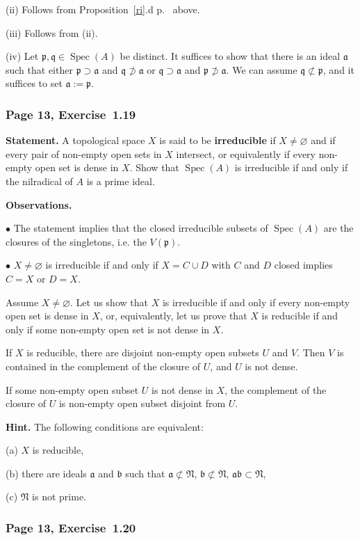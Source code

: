 \documentclass[12pt,letterpaper]{article}%
\newcommand{\mf}{\mathfrak}
\newcommand{\aaa}{\mf a}
\newcommand{\bbb}{\mf b}
\newcommand{\ppp}{\mf p}
\newcommand{\qqq}{\mf q}
\newcommand{\NNN}{\mf N}\newcommand{\RRR}{\mf R}
\newcommand{\bu}{\bullet}
\newcommand{\Spec}{\operatorname{Spec}}\newcommand{\Sp}{\operatorname{Spec}}
\newcommand{\nn}{\noindent}
\begin{document}
\nn(ii) Follows from Proposition~\ref{ri}.d p.~\pageref{ri} above. 

\nn(iii) Follows from (ii).

\nn(iv) Let $\ppp,\qqq\in\Spec(A)$ be distinct. It suffices to show that there is an ideal $\aaa$ such that either $\ppp\supset\aaa$ and $\qqq\not\supset\aaa$ or $\qqq\supset\aaa$ and $\ppp\not\supset\aaa$. We can assume $\qqq\not\subset\ppp$, and it suffices to set $\aaa:=\ppp$.

\subsubsection{Page 13, Exercise~1.19}\label{irr}%

\textbf{Statement.} A topological space $X$ is said to be \textbf{irreducible} if $X\ne\varnothing$ and if every pair of non-empty open sets in $X$ intersect, or equivalently if every non-empty open set is dense in $X$. Show that $\Spec(A)$ is irreducible if and only if the nilradical of $A$ is a prime ideal.

\nn\textbf{Observations.}

\nn$\bu$ The statement implies that the closed irreducible subsets of $\Spec(A)$ are the closures of the singletons, i.e. the $V(\ppp)$. 

\nn$\bu$ $X\ne\varnothing$ is irreducible if and only if $X=C\cup D$ with $C$ and $D$ closed implies $C=X$ or $D=X$. 

Assume $X\ne\varnothing$. Let us show that $X$ is irreducible if and only if every non-empty open set is dense in $X$, or, equivalently, let us prove that $X$ is reducible if and only if some non-empty open set is not dense in $X$. 

If $X$ is reducible, there are disjoint non-empty open subsets $U$ and $V$. Then $V$ is contained in the complement of the closure of $U$, and $U$ is not dense. 

If some non-empty open subset $U$ is not dense in $X$, the complement of the closure of $U$ is non-empty open subset disjoint from $U$. 

\nn\textbf{Hint.} The following conditions are equivalent:

\nn(a) $X$ is reducible, 

\nn(b) there are ideals $\aaa$ and $\bbb$ such that $\aaa\not\subset\NNN$, $\bbb\not\subset\NNN$, $\aaa\bbb\subset\NNN$, 

\nn(c) $\NNN$ is not prime. 

\subsubsection{Page 13, Exercise~1.20}\label{ex1.20}%
\end{document}
